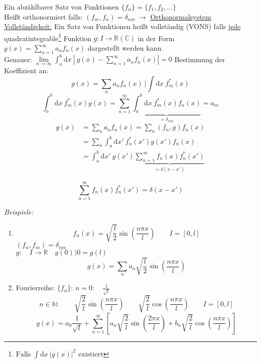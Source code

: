\documentclass[titlepage,11pt,a4paper,ngerman]{report}
\newcommand{\summ}[2]{\sum_{#1}^{#2}}
\newcommand{\intt}[2]{\int_{#1}^{#2}}
\newcommand{\frbox}[2]{\begin{tcolorbox}[colback=white,colframe=red!75!black,fonttitle=\bfseries,title=#1]#2\end{tcolorbox}}
\begin{document}
Ein abzählbarer Satz von Funktionen $\{f_n\} = \{f_1, f_2, \dots \}$\\
Heißt orthonormiert falls: $(f_m,f_n) = \delta_{nm}\ \rightarrow$ \underline{Orthonormalsystem}\\
\underline{Vollständigkeit:} Ein Satz von Funktionen heißt vollständig (VONS) falls \underline{jede} quadratintegrable\footnote{$\textrm{Falls }\int \textrm{d}x\ |g(x)|^2 \textrm{ existiert}$} Funktion $g: I \to \mathbb R (\mathbb C)$ in der Form $g(x) = \summ{n = 1}{\infty} a_n f_n(x)$ dargestellt werden kann.\\
Genauer: $\lim\limits_{n \to \infty} \intt{a}{b} \textrm{d}x\ |\ g(x) - \summ{n = 1}{\infty} a_n f_n(x)| = 0$
Bestimmung der Koeffizient an:
$$g(x) = \sum_n a_n f_n(x)\ | \int \textrm{d}x\ f_m^*(x)$$
$$\intt{a}{b}\textrm{d}x\ f_m^* (x) g(x) = \summ{n = 1}{\infty} \underbrace{\intt{a}{b} \textrm{d}x\ f_m^* (x)f_n(x)}_{= \delta_{nm}} = a_m$$
\begin{align*}
 	g(x) &= \sum_n a_n f_n (x) = \sum_n (f_n,g)f_n(x)\\
 	&= \sum_n \intt{a}{b} \textrm{d}x'\ f_n^* (x') g(x') f_n(x)\\
 	&= \intt{a}{b} \textrm{d}x'\ g(x') \underbrace{\summ{n = 1}{\infty} f_n(x)f_n^*(x')}_{= \delta(x - x')}
\end{align*}
\frbox{Vollständigkeitsrelation}{$$\summ{n = 1}{\infty}f_n(x)f_n^*(x') = \delta(x - x')$$}

\emph{Beispiele:}
\begin{enumerate}[1)]
	\item 
	\begin{equation*}
	f_n(x) = \sqrt{\frac{l}{2}} \sin\left(\frac{n \pi x}{l}\right) \qquad I = [0,l] 
	\end{equation*}
	$ (f_n,f_m) = \delta_{nm} $\\
	$ g: \quad I \rightarrow \mathbb{R} \quad g(0) ) 0 = g(l) $
	\begin{equation*}
	g(x) = \sum_{n} a_n \sqrt{\frac{l}{2}} \sin \left(\frac{n \pi x}{l}\right)
	\end{equation*}
	\item Fourierreihe: $ \{f_n\} $:
	$ n=0: \quad \frac{1}{\sqrt{l}} $
	\begin{equation*}
	n \in \mathbb{N}: \qquad \sqrt{\frac{2}{l}} \sin \left(\frac{n \pi x}{l}\right) \qquad \sqrt{\frac{2}{l}} \cos\left(\frac{n \pi x}{l}\right) \qquad I = [0,l]
	\end{equation*}
	\begin{equation*}
	g(x) = a_0 \frac{1}{\sqrt{l}} + \sum_{n=1}^{\infty} \left[a_n \sqrt{\frac{2}{l}} \sin \left(\frac{2 \pi x}{l}\right) + b_n \sqrt{\frac{2}{l}} \cos\left(\frac{n \pi x}{l}\right)\right]
	\end{equation*}
\end{enumerate}
\end{document}
